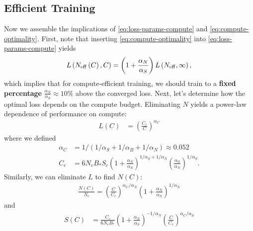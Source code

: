 \documentclass[english]{article}
\begin{document}
\subsection{Efficient Training}
Now we assemble the implications of \eqref{eq:loss-params-compute} and \eqref{eq:compute-optimality}.
First, note that inserting \eqref{eq:compute-optimality} into \eqref{eq:loss-params-compute} yields
\begin{equation}
L\left(N_{{\rm eff}}\left(C\right),C\right)=\left(1+\frac{\alpha_{N}}{\alpha_{S}}\right)L\left(N_{{\rm eff}},\infty\right),
\end{equation}
which implies that for compute-efficient training, we should train to a \textbf{fixed percentage} $\frac{\alpha_{N}}{\alpha_{S}}\approx10\%$ above the converged loss.
Next, let's determine how the optimal loss depends on the compute budget. Eliminating $N$ yields a power-law dependence of performance on compute:
\begin{align}
L\left(C\right) & =\left(\frac{C_{c}}{C}\right)^{\alpha_{C}}
\end{align}
where we defined
\begin{align}
\alpha_{C} & =1/\left(1/\alpha_{S}+1/\alpha_{B}+1/\alpha_{N}\right)\approx0.052\\
C_{c} & =6N_{c}B_{\ast}S_{c}\left(1+\frac{\alpha_{N}}{\alpha_{S}}\right)^{1/\alpha_{S}+1/\alpha_{N}}\left(\frac{\alpha_{S}}{\alpha_{N}}\right)^{1/\alpha_{S}}.
\end{align}
Similarly, we can eliminate $L$ to find $N\left(C\right)$:
\begin{align}
\frac{N\left(C\right)}{N_{c}}=\left(\frac{C}{C_{c}}\right)^{\alpha_{C}/\alpha_{N}}\left(1+\frac{\alpha_{N}}{\alpha_{S}}\right)^{1/\alpha_{N}}
\end{align}
and
\begin{align}
S\left(C\right) & =\frac{C_{c}}{6N_{c}B_{\ast}}\left(1+\frac{\alpha_{N}}{\alpha_{S}}\right)^{-1/\alpha_{N}}\left(\frac{C}{C_{c}}\right)^{\alpha_{C}/\alpha_{S}}
\end{align}
\end{document}
